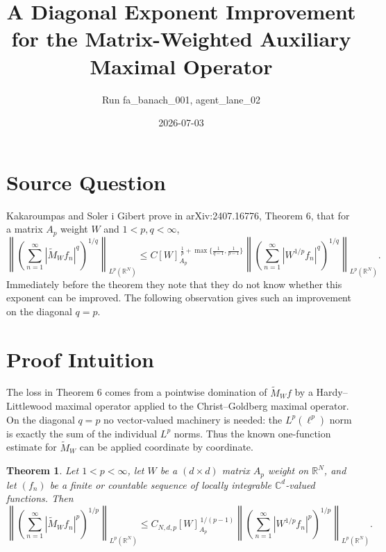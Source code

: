 \documentclass[11pt]{article}
\title{A Diagonal Exponent Improvement for the Matrix-Weighted Auxiliary Maximal Operator}
\author{Run fa\_banach\_001, agent\_lane\_02}
\date{2026-07-03}
\newtheorem{theorem}{Theorem}
\newcommand{\R}{\mathbb{R}}
\newcommand{\C}{\mathbb{C}}
\newcommand{\Lp}{L^p}
\newcommand{\MW}{\widetilde M_W}
\newcommand{\Ap}{A_p}
\begin{document}
\maketitle

\section*{Source Question}

Kakaroumpas and Soler i Gibert prove in arXiv:2407.16776, Theorem 6, that for a
matrix $\Ap$ weight $W$ and $1<p,q<\infty$,
\[
 \left\|\left(\sum_{n=1}^{\infty}|\MW f_n|^q\right)^{1/q}\right\|_{\Lp(\R^N)}
 \le C [W]_{\Ap}^{\,\frac1p+\max\{\frac1{q-1},\frac1{p-1}\}}
 \left\|\left(\sum_{n=1}^{\infty}|W^{1/p} f_n|^q\right)^{1/q}\right\|_{\Lp(\R^N)} .
\]
Immediately before the theorem they note that they do not know whether this
exponent can be improved. The following observation gives such an improvement
on the diagonal $q=p$.

\section*{Proof Intuition}

The loss in Theorem 6 comes from a pointwise domination of $\MW f$ by a Hardy--Littlewood maximal
operator applied to the Christ--Goldberg maximal operator. On the diagonal $q=p$ no vector-valued
machinery is needed: the $L^p(\ell^p)$ norm is exactly the sum of the individual $L^p$ norms. Thus the
known one-function estimate for $\MW$ can be applied coordinate by coordinate.

\begin{theorem}
Let $1<p<\infty$, let $W$ be a $(d\times d)$ matrix $\Ap$ weight on $\R^N$, and let
$(f_n)$ be a finite or countable sequence of locally integrable $\C^d$-valued functions. Then
\[
 \left\|\left(\sum_{n=1}^{\infty}|\MW f_n|^p\right)^{1/p}\right\|_{\Lp(\R^N)}
 \le C_{N,d,p} [W]_{\Ap}^{\,1/(p-1)}
 \left\|\left(\sum_{n=1}^{\infty}|W^{1/p} f_n|^p\right)^{1/p}\right\|_{\Lp(\R^N)} .
\]
\end{theorem}
\end{document}
